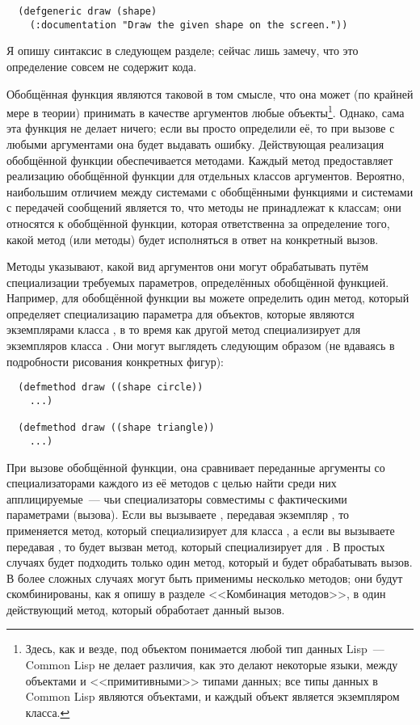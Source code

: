 \begin{lstlisting}
  (defgeneric draw (shape)
    (:documentation "Draw the given shape on the screen."))
\end{lstlisting}

Я опишу синтаксис  в следующем разделе; сейчас лишь замечу, что это
определение совсем не содержит кода.

Обобщённая функция являются таковой в том смысле, что она может (по крайней мере в теории)
принимать в качестве аргументов любые объекты\footnote{Здесь, как и везде, под объектом
  понимается любой тип данных Lisp~--- Common Lisp не делает различия, как это делают
  некоторые языки, между объектами и <<примитивными>> типами данных; все типы данных в
  Common Lisp являются объектами, и каждый объект является экземпляром класса.}.  Однако,
сама эта функция не делает ничего; если вы просто определили её, то при вызове с любыми
аргументами она будет выдавать ошибку. Действующая реализация обобщённой функции
обеспечивается методами. Каждый метод предоставляет реализацию обобщённой функции для
отдельных классов аргументов.  Вероятно, наибольшим отличием между системами с обобщёнными
функциями и системами с передачей сообщений является то, что методы не принадлежат к
классам; они относятся к обобщённой функции, которая ответственна за определение того,
какой метод (или методы) будет исполняться в ответ на конкретный вызов.

Методы указывают, какой вид аргументов они могут обрабатывать путём специализации
требуемых параметров, определённых обобщённой функцией.  Например, для обобщённой функции
 вы можете определить один метод, который определяет специализацию параметра
 для объектов, которые являются экземплярами класса , в то время
как другой метод специализирует  для экземпляров класса .  Они
могут выглядеть следующим образом (не вдаваясь в подробности рисования конкретных фигур):

\begin{lstlisting}
  (defmethod draw ((shape circle))
    ...)

  (defmethod draw ((shape triangle))
    ...)
\end{lstlisting}

При вызове обобщённой функции, она сравнивает переданные аргументы со специализаторами
каждого из её методов с целью найти среди них апплицируемые~--- чьи специализаторы
совместимы с фактическими параметрами (вызова). Если вы вызываете , передавая
экземпляр , то применяется метод, который специализирует  для
класса , а если вы вызываете передавая , то будет вызван
метод, который специализирует  для .  В простых случаях будет
подходить только один метод, который и будет обрабатывать вызов.  В более сложных случаях
могут быть применимы несколько методов; они будут скомбинированы, как я опишу в разделе
<<Комбинация методов>>, в один действующий метод, который обработает данный вызов.

